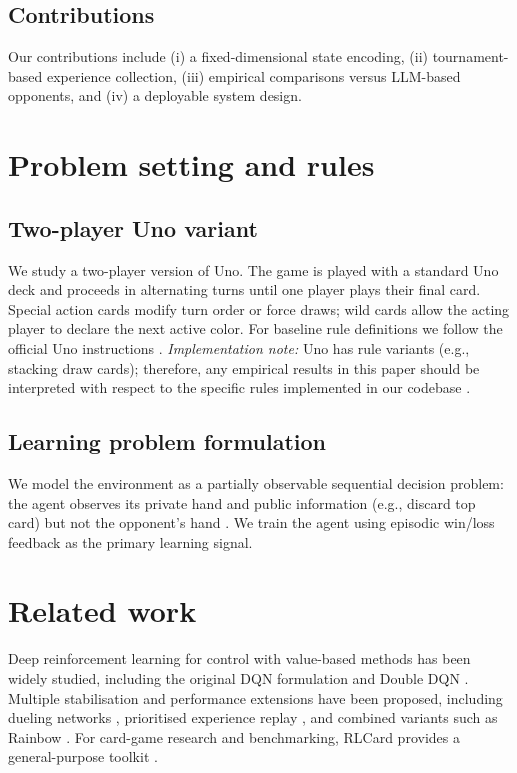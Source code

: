 \documentclass[11pt]{article}
\begin{document}
\subsection{Contributions}
Our contributions include (i) a fixed-dimensional state encoding, (ii) tournament-based experience collection, (iii) empirical comparisons versus LLM-based opponents, and (iv) a deployable system design.

\section{Problem setting and rules}
\subsection{Two-player Uno variant}
We study a two-player version of Uno. The game is played with a standard Uno deck and proceeds in alternating turns until one player plays their final card. Special action cards modify turn order or force draws; wild cards allow the acting player to declare the next active color. For baseline rule definitions we follow the official Uno instructions \parencite{mattel_uno_rules}. \emph{Implementation note:} Uno has rule variants (e.g., stacking draw cards); therefore, any empirical results in this paper should be interpreted with respect to the specific rules implemented in our codebase \parencite{policyuno_repo}.

\subsection{Learning problem formulation}
We model the environment as a partially observable sequential decision problem: the agent observes its private hand and public information (e.g., discard top card) but not the opponent's hand \parencite{kaelbling1998pomdp}. We train the agent using episodic win/loss feedback as the primary learning signal.

\section{Related work}
Deep reinforcement learning for control with value-based methods has been widely studied, including the original DQN formulation \parencite{mnih2015human} and Double DQN \parencite{vanhasselt2016double}. Multiple stabilisation and performance extensions have been proposed, including dueling networks \parencite{wang2016dueling}, prioritised experience replay \parencite{schaul2016prioritized}, and combined variants such as Rainbow \parencite{hessel2018rainbow}. For card-game research and benchmarking, RLCard provides a general-purpose toolkit \parencite{zha2019rlcard}.
\end{document}
